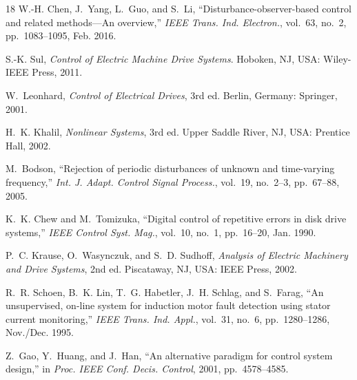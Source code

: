 \documentclass[journal]{IEEEtran}
\theoremstyle{remark}
\begin{document}
\begin{thebibliography}{18}
W.-H. Chen, J.~Yang, L.~Guo, and S.~Li, \textquotedblleft{}Disturbance-observer-based control and related methods---An overview,\textquotedblright{} \emph{IEEE Trans. Ind. Electron.}, vol.~63, no.~2, pp.~1083--1095, Feb. 2016.

S.-K. Sul, \emph{Control of Electric Machine Drive Systems}. Hoboken, NJ, USA: Wiley-IEEE Press, 2011.

W.~Leonhard, \emph{Control of Electrical Drives}, 3rd ed. Berlin, Germany: Springer, 2001.

H.~K. Khalil, \emph{Nonlinear Systems}, 3rd ed. Upper Saddle River, NJ, USA: Prentice Hall, 2002.

M.~Bodson, \textquotedblleft{}Rejection of periodic disturbances of unknown and time-varying frequency,\textquotedblright{} \emph{Int. J. Adapt. Control Signal Process.}, vol.~19, no.~2--3, pp.~67--88, 2005.

K.~K. Chew and M.~Tomizuka, \textquotedblleft{}Digital control of repetitive errors in disk drive systems,\textquotedblright{} \emph{IEEE Control Syst. Mag.}, vol.~10, no.~1, pp.~16--20, Jan. 1990.

P.~C. Krause, O.~Wasynczuk, and S.~D. Sudhoff, \emph{Analysis of Electric Machinery and Drive Systems}, 2nd ed. Piscataway, NJ, USA: IEEE Press, 2002.

R.~R. Schoen, B.~K. Lin, T.~G. Habetler, J.~H. Schlag, and S.~Farag, \textquotedblleft{}An unsupervised, on-line system for induction motor fault detection using stator current monitoring,\textquotedblright{} \emph{IEEE Trans. Ind. Appl.}, vol.~31, no.~6, pp.~1280--1286, Nov./Dec. 1995.

Z.~Gao, Y.~Huang, and J.~Han, \textquotedblleft{}An alternative paradigm for control system design,\textquotedblright{} in \emph{Proc. IEEE Conf. Decis. Control}, 2001, pp.~4578--4585.

\end{thebibliography}
\end{document}
